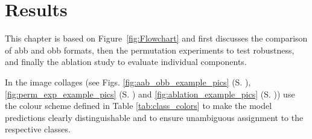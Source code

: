 \chapter{Results}
\label{ch:results}
This chapter is based on Figure~\ref{fig:Flowchart} and first discusses the comparison of \acrshort{abb} and \acrshort{obb} formats, then the permutation experiments to test robustness, and finally the ablation study to evaluate individual components.

In the image collages (see Figs. \ref{fig:aab_obb_example_pics} (S. \pageref{fig:aab_obb_example_pics}), \ref{fig:perm_exp_example_pics} (S. \pageref{fig:perm_exp_example_pics}) and \ref{fig:ablation_example_pics} (S. \pageref{fig:ablation_example_pics})) use the colour scheme defined in Table \ref{tab:class_colors} to make the model predictions clearly distinguishable and to ensure unambiguous assignment to the respective classes.

